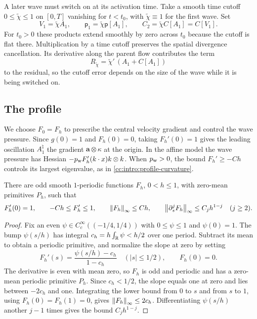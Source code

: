 A later wave must switch on at its activation time. Take a smooth time
cutoff $0\le\widetilde\chi\le1$ on $[0,T]$ vanishing for $t<t_0$,
with $\widetilde\chi\equiv1$ for the first wave. Set
\begin{equation}\label{cc:uf:hier:eq:switched}
 V_1=\widetilde\chi A_1,\qquad
 \mathsf p_1=\widetilde\chi\mathsf p[A_1],\qquad
 C_2=\widetilde\chi C[A_1]=C[V_1].
\end{equation}
For $t_0>0$ these products extend smoothly by zero across $t_0$
because the cutoff is flat there. Multiplication by a time cutoff preserves
the spatial divergence cancellation. Its derivative along the parent
flow contributes the term
\begin{equation}\label{cc:uf:hier:eq:switch}
 R_{\widetilde\chi}=\widetilde\chi'\,(A_1+C[A_1])
\end{equation}
to the residual, so the cutoff error depends on the size of the wave
while it is being switched on.

\subsection{The profile}\label{cc:sec:profile}
We choose $F_0=F_h$ to prescribe the central velocity gradient and
control the wave pressure. Since $g(0)=1$ and $F_h(0)=0$, taking
$F_h'(0)=1$ gives the leading oscillation $A_1^\natural$ the gradient
$\mathbf a\otimes\kappa$ at the origin. In the affine model the wave
pressure has Hessian $-p_{\rm w}F_h'(k\cdot x)k\otimes k$. When $p_{\rm w}>0$,
the bound $F_h'\ge-Ch$ controls its largest eigenvalue, as in
\eqref{cc:intro:profile-curvature}.

\begin{lemma}\label{cc:uf:exact:lem:profile}
There are odd smooth \(1\)-periodic functions
\(F_h\), \(0<h\le1\), with zero-mean primitives \(P_h\), such that
\[
 F_h'(0)=1,\qquad -Ch\le F_h'\le1,\qquad
 \left\lVert F_h\right\rVert_\infty\le Ch,\qquad
 \left\lVert\partial_s^jF_h\right\rVert_\infty\le C_jh^{1-j}\quad(j\ge2).
\]
\end{lemma}
\begin{proof}
Fix an even $\psi\in C_c^\infty((-1/4,1/4))$ with $0\le\psi\le1$ and
$\psi(0)=1$. The bump $\psi(s/h)$ has integral
$c_h=h\int_{\mathbb R}\psi<h/2$ over one period. Subtract its mean to obtain a
periodic primitive, and normalize the slope at zero by setting
\[
 F_h'(s)=\frac{\psi(s/h)-c_h}{1-c_h}\quad(|s|\le1/2),\qquad F_h(0)=0.
\]
The derivative is even with mean zero, so $F_h$ is odd and periodic
and has a zero-mean periodic primitive $P_h$.
Since $c_h<1/2$, the slope equals one at zero and lies between $-2c_h$
and one. Integrating the lower bound from $0$ to $s$ and from $s$ to $1$,
using $F_h(0)=F_h(1)=0$, gives $\left\lVert F_h\right\rVert_\infty\le 2c_h$.
Differentiating $\psi(s/h)$ another $j-1$ times gives the bound $C_jh^{1-j}$.
\end{proof}
